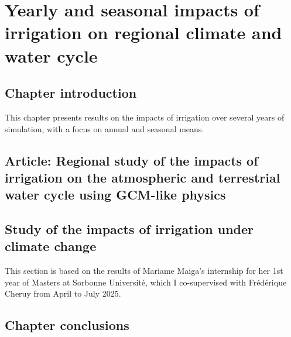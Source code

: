 \chapter{Yearly and seasonal impacts of irrigation on regional climate and water cycle}
\label{chap:monthly}
\minitoc
\pagebreak

\section{Chapter introduction}
This chapter presents results on the impacts of irrigation over several years of simulation, with a focus on annual and seasonal means. 


\section{Article: Regional study of the impacts of irrigation on the atmospheric and terrestrial water cycle using GCM-like physics}

\section{Study of the impacts of irrigation under climate change}
This section is based on the results of Mariame Maiga's internship for her 1st year of Masters at Sorbonne Université, which I co-supervised with Frédérique Cheruy from April to July 2025.

\section{Chapter conclusions}